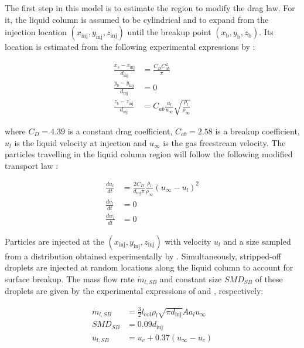 The first step in this model is to estimate the region to modify the drag law. For it, the liquid column is assumed to be cylindrical and to expand from the injection location $\left( x_\mathrm{inj}, y_\mathrm{inj}, z_\mathrm{inj} \right)$ until the breakup point $\left( x_\mathrm{b}, y_\mathrm{b}, z_\mathrm{b} \right)$. Its location is estimated from the following experimental expressions by :

\begin{subequations}
\label{eq:jaegle_breakup_point}
\begin{align}
\frac{x_b - x_\mathrm{inj}}{d_\mathrm{inj}} &= \frac{C_D C_{ab}^2}{\pi} \\
\frac{y_b - y_\mathrm{inj}}{d_\mathrm{inj}} &= 0 \\
\frac{z_b - z_\mathrm{inj}}{d_\mathrm{inj}} &= C_{ab} \frac{u_l}{u_\infty} \sqrt{\frac{\rho_l}{\rho_\infty}}
\end{align}
\end{subequations}

where $C_D = 4.39$ is a constant drag coefficient, $C_{ab} = 2.58$ is a breakup coefficient, $u_l$ is the liquid velocity at injection and $u_\infty$ is the gas freestream velocity. The particles travelling in the liquid column region will follow the following modified transport law :

\begin{subequations}
\label{eq:momentum_jaegle_model}
\begin{align}
\frac{d u_l}{d t} &= \frac{2 C_D}{d_\mathrm{inj} \pi} \frac{\rho_l}{\rho_\infty} \left( u_\infty - u_l \right)^2  \\
\frac{d v_l}{d t} &= 0 \\
\frac{d w_l}{d t} &= 0 
\end{align}
\end{subequations}

Particles are injected at the $\left( x_\mathrm{inj}, y_\mathrm{inj}, z_\mathrm{inj} \right)$ with  velocity $u_l$ and a size sampled from a distribution obtained experimentally by . Simultaneously, stripped-off droplets are injected at random locations along the liquid column to account for surface breakup. The mass flow rate $\dot{m}_{l,SB}$ and constant size $SMD_{SB}$ of these droplets are given by the experimental expressions of  and , respectively:

\begin{subequations}
\label{eq:surface_breakup_jaegle_model}
\begin{align}
\dot{m}_{l,SB} &= \frac{3}{2} l_\mathrm{col} \rho_l \sqrt{\pi d_\mathrm{inj}} A a_l u_\infty \\
SMD_{SB} &= 0.09 d_\mathrm{inj} \\
u_{l,SB} &= u_c + 0.37 \left( u_\infty - u_c \right)
\end{align}
\end{subequations}

